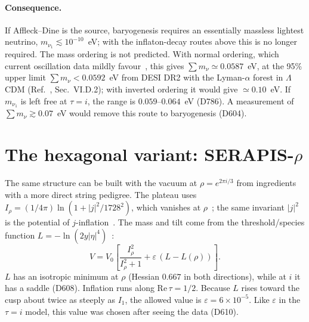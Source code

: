 \documentclass[aps,prd,twocolumn,superscriptaddress,nofootinbib,floatfix]{revtex4-2}
\begin{document}
\paragraph{Consequence.} If Affleck--Dine is the source, baryogenesis requires an essentially massless lightest neutrino, $m_{\nu_1}\lesssim10^{-10}$~eV; with the inflaton-decay routes above this is no longer required. The mass ordering is not predicted. With normal ordering, which current oscillation data mildly favour~\cite{arXiv_2410_05380}, this gives $\sum m_\nu\simeq0.0587$~eV, at the 95\% upper limit $\sum m_\nu < 0.0592$~eV from DESI DR2 with the Lyman-$\alpha$ forest in $\Lambda$CDM (Ref.~\cite{arXiv_2607_27410}, Sec.~VI.D.2); with inverted ordering it would give $\simeq0.10$~eV. If $m_{\nu_1}$ is left free at $\tau=i$, the range is $0.059$--$0.064$~eV (D786). A measurement of $\sum m_\nu \gtrsim 0.07$~eV would remove this route to baryogenesis (D604).

\section{The hexagonal variant: SERAPIS-$\rho$}\label{sec:rho}
The same structure can be built with the vacuum at $\rho = e^{2\pi i/3}$ from ingredients with a more direct string pedigree. The plateau uses $I_\rho = (1/4\pi)\ln(1+|j|^2/1728^2)$, which vanishes at $\rho$~\cite{arXiv_2408_05203}; the same invariant $|j|^2$ is the potential of $j$-inflation~\cite{arXiv_1612_09559}. The mass and tilt come from the threshold/species function $L = -\ln(2y|\eta|^4)$~\cite{arXiv_2407_12081,arXiv_2411_08467}:
\begin{equation}
V = V_0\left[\frac{I_\rho^2}{I_\rho^2+1} + \varepsilon\,(L - L(\rho))\right].
\end{equation}
$L$ has an isotropic minimum at $\rho$ (Hessian $0.667$ in both directions), while at $i$ it has a saddle (D608). Inflation runs along $\mathrm{Re}\,\tau = 1/2$. Because $L$ rises toward the cusp about twice as steeply as $I_1$, the allowed value is $\varepsilon = 6\times10^{-5}$. Like $\varepsilon$ in the $\tau = i$ model, this value was chosen after seeing the data (D610).
\end{document}
